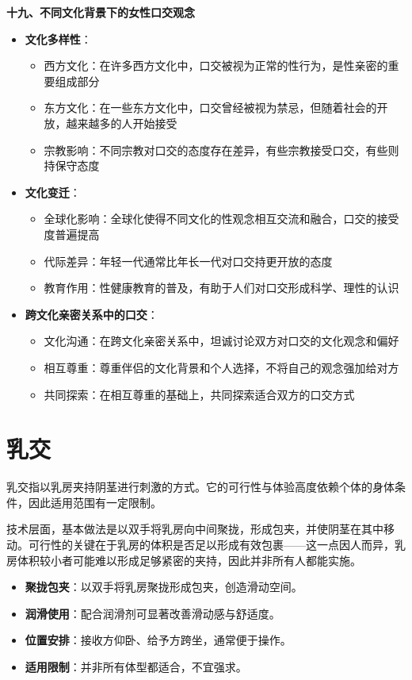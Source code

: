 \documentclass[12pt,UTF8]{ctexbook}
\begin{document}
  \textbf{十九、不同文化背景下的女性口交观念}
  \begin{itemize}
  \item \textbf{文化多样性}：
    \begin{itemize}
    \item 西方文化：在许多西方文化中，口交被视为正常的性行为，是性亲密的重要组成部分
    \item 东方文化：在一些东方文化中，口交曾经被视为禁忌，但随着社会的开放，越来越多的人开始接受
    \item 宗教影响：不同宗教对口交的态度存在差异，有些宗教接受口交，有些则持保守态度
    \end{itemize}
  \item \textbf{文化变迁}：
    \begin{itemize}
    \item 全球化影响：全球化使得不同文化的性观念相互交流和融合，口交的接受度普遍提高
    \item 代际差异：年轻一代通常比年长一代对口交持更开放的态度
    \item 教育作用：性健康教育的普及，有助于人们对口交形成科学、理性的认识
    \end{itemize}
  \item \textbf{跨文化亲密关系中的口交}：
    \begin{itemize}
    \item 文化沟通：在跨文化亲密关系中，坦诚讨论双方对口交的文化观念和偏好
    \item 相互尊重：尊重伴侣的文化背景和个人选择，不将自己的观念强加给对方
    \item 共同探索：在相互尊重的基础上，共同探索适合双方的口交方式
    \end{itemize}
  \end{itemize}

\section{乳交}

乳交指以乳房夹持阴茎进行刺激的方式。它的可行性与体验高度依赖个体的身体条件，因此适用范围有一定限制。

技术层面，基本做法是以双手将乳房向中间聚拢，形成包夹，并使阴茎在其中移动。可行性的关键在于乳房的体积是否足以形成有效包裹——这一点因人而异，乳房体积较小者可能难以形成足够紧密的夹持，因此并非所有人都能实施。

\begin{itemize}
\item \textbf{聚拢包夹}：以双手将乳房聚拢形成包夹，创造滑动空间。
\item \textbf{润滑使用}：配合润滑剂可显著改善滑动感与舒适度。
\item \textbf{位置安排}：接收方仰卧、给予方跨坐，通常便于操作。
\item \textbf{适用限制}：并非所有体型都适合，不宜强求。
\end{itemize}
\end{document}
